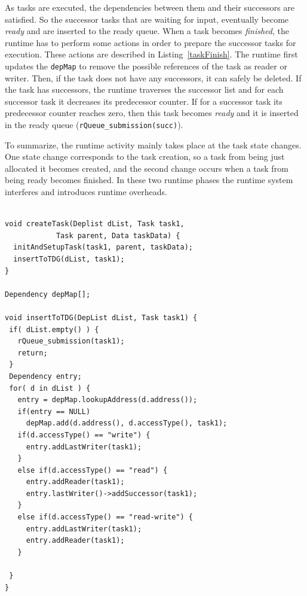 As tasks are executed, the dependencies between them and their successors are satisfied. 
So the successor tasks that are waiting for input, eventually become \textit{ready} and are inserted to the ready queue.
When a task becomes \textit{finished}, the runtime has to perform some actions in order to prepare the successor tasks for execution.
These actions are described in Listing~\ref{taskFinish}.
The runtime first updates the \texttt{depMap} to remove the possible references of the task as reader or writer.
Then, if the task does not have any successors, it can safely be deleted.
If the task has successors, the runtime traverses the successor list and for each successor task it decreases its predecessor counter.
If for a successor task its predecessor counter reaches zero, then this task becomes \textit{ready} and it is inserted in the ready queue (\texttt{rQueue\_submission(succ)}).

To summarize, the runtime activity mainly takes place at the task state changes. 
One state change corresponds to the task creation, so a task from being just allocated it becomes created, and the second change occurs when a task from being ready becomes finished. 
In these two runtime phases the runtime system interferes and introduces runtime overheads.


\begin{lstlisting}[float, emph={void,if,return,not,true,and,break}, captionpos=b, caption={Pseudo-code for task creation.},label=taskCreation, emph={[2]mat}, emphstyle={[2]}, aboveskip={0\baselineskip}, frame=tb, belowskip={0\baselineskip}]

void createTask(Deplist dList, Task task1, 
            Task parent, Data taskData) {
  initAndSetupTask(task1, parent, taskData);
  insertToTDG(dList, task1);
}

Dependency depMap[];

void insertToTDG(DepList dList, Task task1) {
 if( dList.empty() ) {
   rQueue_submission(task1);
   return;
 }
 Dependency entry;
 for( d in dList ) {
   entry = depMap.lookupAddress(d.address());
   if(entry == NULL) 
     depMap.add(d.address(), d.accessType(), task1);
   if(d.accessType() == "write") {
     entry.addLastWriter(task1);
   }
   else if(d.accessType() == "read") {
     entry.addReader(task1);
     entry.lastWriter()->addSuccessor(task1);
   }
   else if(d.accessType() == "read-write") {
     entry.addLastWriter(task1);
     entry.addReader(task1);
   }

 }
}
\end{lstlisting}

